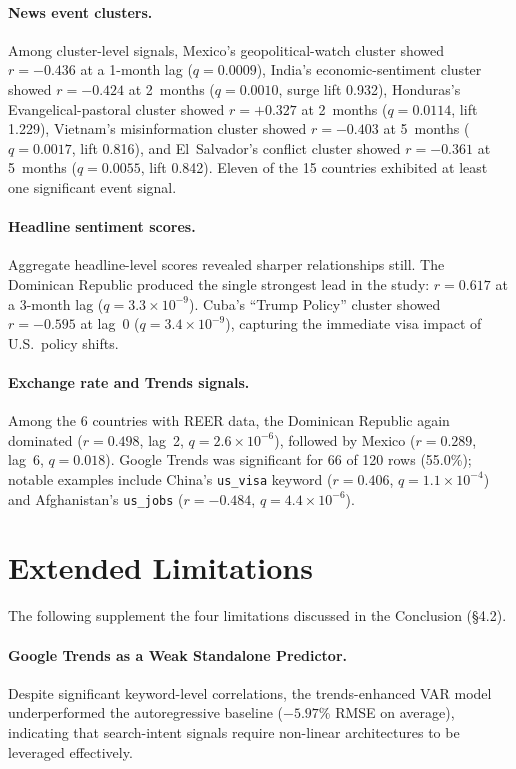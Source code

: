 \documentclass[11pt, a4paper]{article}
\begin{document}
\begin{appendices}
\paragraph{News event clusters.}
Among cluster-level signals, Mexico's geopolitical-watch cluster showed
$r = -0.436$ at a 1-month lag ($q = 0.0009$), India's economic-sentiment cluster
showed $r = -0.424$ at 2~months ($q = 0.0010$, surge lift 0.932), Honduras's
Evangelical-pastoral cluster showed $r = +0.327$ at 2~months ($q = 0.0114$,
lift 1.229), Vietnam's misinformation cluster showed $r = -0.403$ at 5~months
($q = 0.0017$, lift 0.816), and El~Salvador's conflict cluster showed $r = -0.361$
at 5~months ($q = 0.0055$, lift 0.842).  Eleven of the 15 countries exhibited at
least one significant event signal.

\paragraph{Headline sentiment scores.}
Aggregate headline-level scores revealed sharper relationships still.  The
Dominican Republic produced the single strongest lead in the study: $r = 0.617$ at
a 3-month lag ($q = 3.3 \times 10^{-9}$).  Cuba's ``Trump Policy'' cluster showed
$r = -0.595$ at lag~0 ($q = 3.4 \times 10^{-9}$), capturing the immediate visa
impact of U.S.\ policy shifts.

\paragraph{Exchange rate and Trends signals.}
Among the 6 countries with REER data, the Dominican Republic again dominated
($r = 0.498$, lag~2, $q = 2.6 \times 10^{-6}$), followed by Mexico ($r = 0.289$,
lag~6, $q = 0.018$).  Google Trends was significant for 66 of 120 rows (55.0\%);
notable examples include China's \texttt{us\_visa} keyword ($r = 0.406$,
$q = 1.1 \times 10^{-4}$) and Afghanistan's \texttt{us\_jobs} ($r = -0.484$,
$q = 4.4 \times 10^{-6}$).


\section{Extended Limitations}\label{app:limitations}

The following supplement the four limitations discussed in the Conclusion (§4.2).

\paragraph{Google Trends as a Weak Standalone Predictor.}
Despite significant keyword-level correlations, the trends-enhanced VAR model
underperformed the autoregressive baseline ($-5.97\%$ RMSE on average), indicating that
search-intent signals require non-linear architectures to be leveraged effectively.


\end{appendices}
\end{document}

